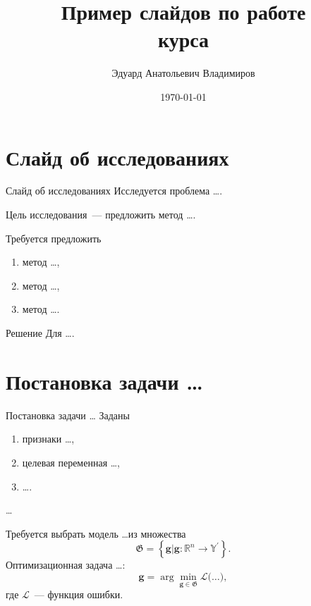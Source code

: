 \documentclass[10pt,pdf,hyperref={unicode}]{beamer}
\title[Пример слайдов по работе]{Пример слайдов по работе \\ курса}
\author{Эдуард Анатольевич Владимиров}
\institute[]{Московский физико-технический институт}
\date{\today}
\begin{document}
\begin{frame}
\titlepage
\end{frame}

\section{Слайд об исследованиях}
\begin{frame}{Слайд об исследованиях}
\bigskip
Исследуется проблема \ldots.
\begin{block}{Цель исследования~---}
предложить метод \ldots.
\end{block}
\begin{block}{Требуется предложить}
\justifying
\begin{enumerate}[1)]
\item метод \ldots,
\item метод \ldots,
\item метод \ldots.
\end{enumerate}
\end{block}
\begin{block}{Решение}
Для \ldots.
\end{block}
\end{frame}

\section{Постановка задачи \ldots}
\begin{frame}{Постановка задачи \ldots}
Заданы
\begin{enumerate}[1)]
    \item признаки \ldots,
    \item целевая переменная \ldots,
    \item \ldots.
\end{enumerate}

\ldots

\bigskip

Требуется выбрать модель \ldots из множества
\[
	\mathfrak{G} = \left\{\mathbf{g}| \mathbf{g}:\mathbb{R}^{n} \to \mathbb{Y}^\prime\right\}.
\]
Оптимизационная задача \ldots:
\[
	\mathbf{g} = \arg\min_{\mathbf{g} \in \mathfrak{G}} \mathcal{L}\bigr(\ldots\bigr),
\]
где $\mathcal{L}$~--- функция ошибки.

\bigskip
{}
\end{frame}
\end{document}

